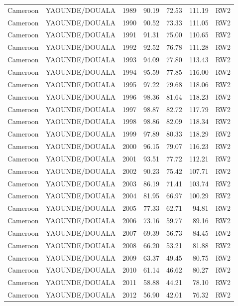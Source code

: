 \begin{longtable}{lllrrrl}
  Cameroon & YAOUNDE/DOUALA & 1989 & 90.19 & 72.53 & 111.19 & RW2 \\ 
  Cameroon & YAOUNDE/DOUALA & 1990 & 90.52 & 73.33 & 111.05 & RW2 \\ 
  Cameroon & YAOUNDE/DOUALA & 1991 & 91.31 & 75.00 & 110.65 & RW2 \\ 
  Cameroon & YAOUNDE/DOUALA & 1992 & 92.52 & 76.78 & 111.28 & RW2 \\ 
  Cameroon & YAOUNDE/DOUALA & 1993 & 94.09 & 77.80 & 113.43 & RW2 \\ 
  Cameroon & YAOUNDE/DOUALA & 1994 & 95.59 & 77.85 & 116.00 & RW2 \\ 
  Cameroon & YAOUNDE/DOUALA & 1995 & 97.22 & 79.68 & 118.06 & RW2 \\ 
  Cameroon & YAOUNDE/DOUALA & 1996 & 98.36 & 81.64 & 118.23 & RW2 \\ 
  Cameroon & YAOUNDE/DOUALA & 1997 & 98.87 & 82.72 & 117.79 & RW2 \\ 
  Cameroon & YAOUNDE/DOUALA & 1998 & 98.86 & 82.09 & 118.34 & RW2 \\ 
  Cameroon & YAOUNDE/DOUALA & 1999 & 97.89 & 80.33 & 118.29 & RW2 \\ 
  Cameroon & YAOUNDE/DOUALA & 2000 & 96.15 & 79.07 & 116.23 & RW2 \\ 
  Cameroon & YAOUNDE/DOUALA & 2001 & 93.51 & 77.72 & 112.21 & RW2 \\ 
  Cameroon & YAOUNDE/DOUALA & 2002 & 90.23 & 75.42 & 107.71 & RW2 \\ 
  Cameroon & YAOUNDE/DOUALA & 2003 & 86.19 & 71.41 & 103.74 & RW2 \\ 
  Cameroon & YAOUNDE/DOUALA & 2004 & 81.95 & 66.97 & 100.29 & RW2 \\ 
  Cameroon & YAOUNDE/DOUALA & 2005 & 77.33 & 62.71 & 94.81 & RW2 \\ 
  Cameroon & YAOUNDE/DOUALA & 2006 & 73.16 & 59.77 & 89.16 & RW2 \\ 
  Cameroon & YAOUNDE/DOUALA & 2007 & 69.39 & 56.73 & 84.45 & RW2 \\ 
  Cameroon & YAOUNDE/DOUALA & 2008 & 66.20 & 53.21 & 81.88 & RW2 \\ 
  Cameroon & YAOUNDE/DOUALA & 2009 & 63.37 & 49.45 & 80.75 & RW2 \\ 
  Cameroon & YAOUNDE/DOUALA & 2010 & 61.14 & 46.62 & 80.27 & RW2 \\ 
  Cameroon & YAOUNDE/DOUALA & 2011 & 58.88 & 44.21 & 78.10 & RW2 \\ 
  Cameroon & YAOUNDE/DOUALA & 2012 & 56.90 & 42.01 & 76.32 & RW2 \\ 

\end{longtable}
